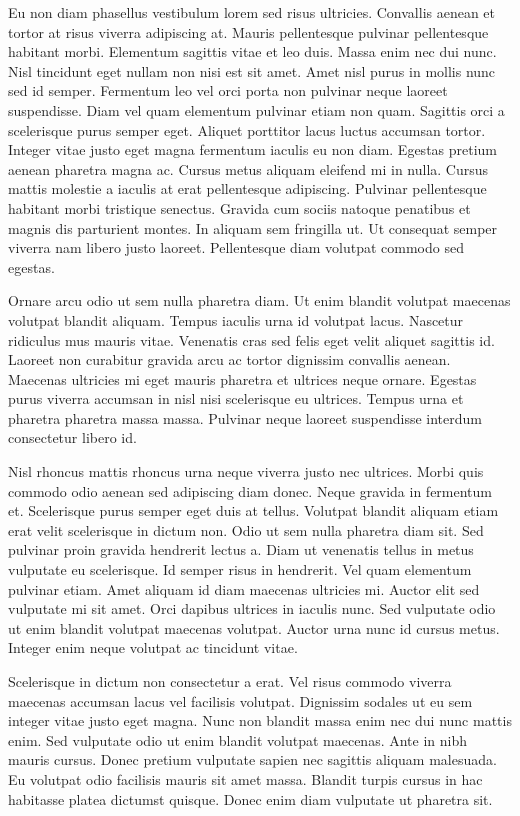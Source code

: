 \documentclass[conference]{IEEEtran}
\begin{document}
Eu non diam phasellus vestibulum lorem sed risus ultricies. Convallis aenean et tortor at risus viverra adipiscing at. Mauris pellentesque pulvinar pellentesque habitant morbi. Elementum sagittis vitae et leo duis. Massa enim nec dui nunc. Nisl tincidunt eget nullam non nisi est sit amet. Amet nisl purus in mollis nunc sed id semper. Fermentum leo vel orci porta non pulvinar neque laoreet suspendisse. Diam vel quam elementum pulvinar etiam non quam. Sagittis orci a scelerisque purus semper eget. Aliquet porttitor lacus luctus accumsan tortor. Integer vitae justo eget magna fermentum iaculis eu non diam. Egestas pretium aenean pharetra magna ac. Cursus metus aliquam eleifend mi in nulla. Cursus mattis molestie a iaculis at erat pellentesque adipiscing. Pulvinar pellentesque habitant morbi tristique senectus. Gravida cum sociis natoque penatibus et magnis dis parturient montes. In aliquam sem fringilla ut. Ut consequat semper viverra nam libero justo laoreet. Pellentesque diam volutpat commodo sed egestas.

Ornare arcu odio ut sem nulla pharetra diam. Ut enim blandit volutpat maecenas volutpat blandit aliquam. Tempus iaculis urna id volutpat lacus. Nascetur ridiculus mus mauris vitae. Venenatis cras sed felis eget velit aliquet sagittis id. Laoreet non curabitur gravida arcu ac tortor dignissim convallis aenean. Maecenas ultricies mi eget mauris pharetra et ultrices neque ornare. Egestas purus viverra accumsan in nisl nisi scelerisque eu ultrices. Tempus urna et pharetra pharetra massa massa. Pulvinar neque laoreet suspendisse interdum consectetur libero id.

Nisl rhoncus mattis rhoncus urna neque viverra justo nec ultrices. Morbi quis commodo odio aenean sed adipiscing diam donec. Neque gravida in fermentum et. Scelerisque purus semper eget duis at tellus. Volutpat blandit aliquam etiam erat velit scelerisque in dictum non. Odio ut sem nulla pharetra diam sit. Sed pulvinar proin gravida hendrerit lectus a. Diam ut venenatis tellus in metus vulputate eu scelerisque. Id semper risus in hendrerit. Vel quam elementum pulvinar etiam. Amet aliquam id diam maecenas ultricies mi. Auctor elit sed vulputate mi sit amet. Orci dapibus ultrices in iaculis nunc. Sed vulputate odio ut enim blandit volutpat maecenas volutpat. Auctor urna nunc id cursus metus. Integer enim neque volutpat ac tincidunt vitae.

Scelerisque in dictum non consectetur a erat. Vel risus commodo viverra maecenas accumsan lacus vel facilisis volutpat. Dignissim sodales ut eu sem integer vitae justo eget magna. Nunc non blandit massa enim nec dui nunc mattis enim. Sed vulputate odio ut enim blandit volutpat maecenas. Ante in nibh mauris cursus. Donec pretium vulputate sapien nec sagittis aliquam malesuada. Eu volutpat odio facilisis mauris sit amet massa. Blandit turpis cursus in hac habitasse platea dictumst quisque. Donec enim diam vulputate ut pharetra sit.
\end{document}
